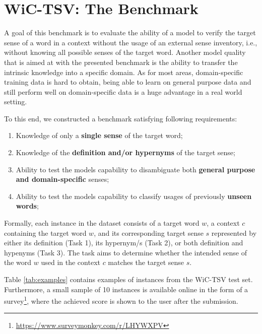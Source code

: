 \documentclass[11pt,a4paper]{article}
\begin{document}
\section{WiC-TSV: The Benchmark} 
\label{benchmark}



A goal of this benchmark is to evaluate the ability of a model to
verify the target sense of
a word in a context without the usage of an external sense inventory, i.e., without knowing all possible senses of the target word. Another model quality that is aimed at with the presented benchmark is the ability to transfer the intrinsic knowledge into a specific domain. As for most areas, domain-specific training data is hard to obtain, being able to learn on general purpose data and still perform well on domain-specific data is a huge advantage in a real world setting. 

To this end, we constructed a benchmark satisfying following requirements:
\begin{enumerate}
    \item Knowledge of only a \textbf{single sense} of the target word;\label{req1}
    \item Knowledge of the \textbf{definition and/or hypernyms} of the target sense; \label{req2}
    \item Ability to test the models capability to disambiguate both \textbf{general purpose and domain-specific} senses; \label{req3}
    \item Ability to test the models capability to classify usages of previously \textbf{unseen words};
    \label{req4}
\end{enumerate}






Formally, each instance in the dataset consists of a target word $w$, a context $c$ containing the target word $w$, and its corresponding target sense $s$ represented by either its definition (Task 1), its hypernym/s (Task 2), or both definition and hypenyms (Task 3). The task aims to determine whether the intended sense of the word $w$ used in the context $c$ matches the target sense $s$. 

Table \ref{tab:examples} contains examples of instances from the WiC-TSV test set. Furthermore, a small sample of 10 
instances is available online in the form of a survey\footnote{\url{https://www.surveymonkey.com/r/LHYWXPV}}, where the achieved score is shown to the user after the submission.
\end{document}
